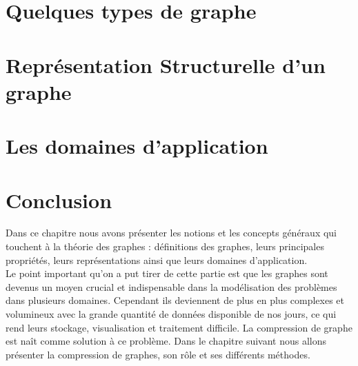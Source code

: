 	\section{Quelques types de graphe}
			
	
	
    		
    	\section{Représentation Structurelle d'un graphe}	
		
	
	\section{Les domaines d'application}
			
		
	
	
			
	\section{Conclusion}
Dans ce chapitre nous avons présenter les notions et les concepts généraux qui touchent à la théorie des graphes : définitions des graphes, leurs principales propriétés, leurs représentations ainsi que leurs domaines d'application.\\
Le point important qu'on a put tirer de cette partie est que les graphes sont devenus un moyen crucial et indispensable dans la modélisation des problèmes dans plusieurs domaines. Cependant ils deviennent de plus en plus complexes et volumineux avec la grande quantité de données disponible de nos jours, ce qui rend leurs stockage, visualisation et traitement difficile. La compression de graphe est naît comme solution à ce problème. Dans le chapitre suivant nous allons présenter la compression de graphes, son rôle et ses différents méthodes.  
	
	